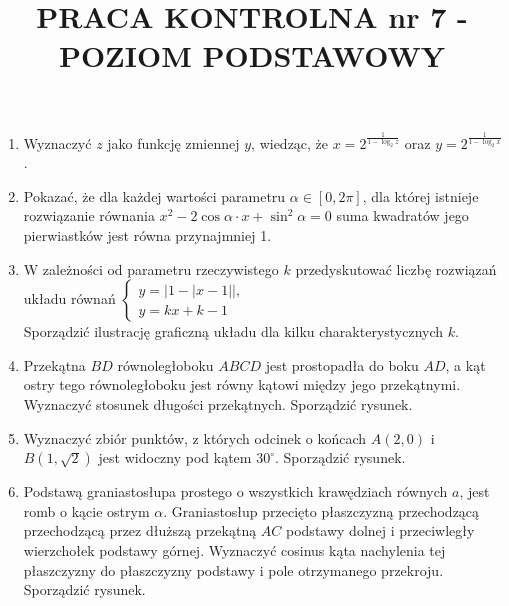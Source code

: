 \documentclass[10pt]{article}
\title{PRACA KONTROLNA nr 7 - POZIOM PODSTAWOWY }
\author{}
\date{}
\begin{document}
\maketitle
\begin{enumerate}
  \item Wyznaczyć $z$ jako funkcję zmiennej $y$, wiedząc, że $x=2^{\frac{1}{1-\log _{2} z}}$ oraz $y=2^{\frac{1}{1-\log _{2} x}}$.
  \item Pokazać, że dla każdej wartości parametru $\alpha \in[0,2 \pi]$, dla której istnieje rozwiązanie równania $x^{2}-2 \cos \alpha \cdot x+\sin ^{2} \alpha=0$ suma kwadratów jego pierwiastków jest równa przynajmniej 1.
  \item W zależności od parametru rzeczywistego $k$ przedyskutować liczbę rozwiązań układu równań $\left\{\begin{array}{l}y=|1-|x-1||, \\ y=k x+k-1\end{array}\right.$\\
Sporządzić ilustrację graficzną układu dla kilku charakterystycznych $k$.
  \item Przekątna $B D$ równoległoboku $A B C D$ jest prostopadła do boku $A D$, a kąt ostry tego równoległoboku jest równy kątowi między jego przekątnymi. Wyznaczyć stosunek długości przekątnych. Sporządzić rysunek.
  \item Wyznaczyć zbiór punktów, z których odcinek o końcach $A(2,0)$ i $B(1, \sqrt{2})$ jest widoczny pod kątem $30^{\circ}$. Sporządzić rysunek.
  \item Podstawą graniastosłupa prostego o wszystkich krawędziach równych $a$, jest romb o kącie ostrym $\alpha$. Graniastosłup przecięto płaszczyzną przechodzącą przechodzącą przez dłuższą przekątną $A C$ podstawy dolnej i przeciwległy wierzchołek podstawy górnej. Wyznaczyć cosinus kąta nachylenia tej płaszczyzny do płaszczyzny podstawy i pole otrzymanego przekroju. Sporządzić rysunek.
\end{enumerate}
\end{document}
